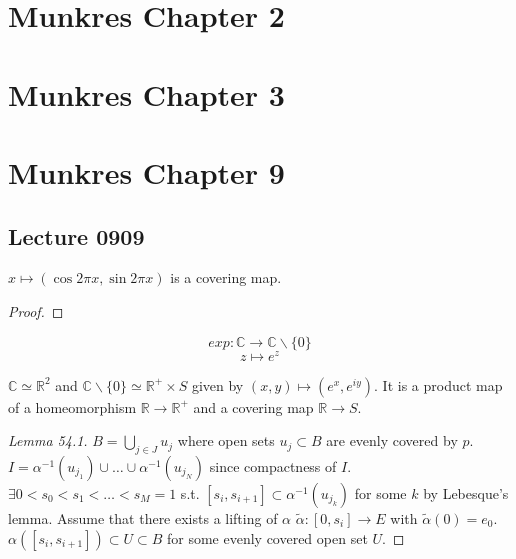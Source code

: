 \documentclass{article}
\begin{document}
\begin{multicols}{2}
\tableofcontents

\section{Munkres Chapter 2}

\clearpage

\section{Munkres Chapter 3}

\clearpage

\section{Munkres Chapter 9}

\clearpage

\subsection{Lecture 0909}

\begin{mytheorem}
$x\mapsto (\cos 2\pi x, \sin 2\pi x)$ is a covering map.
\end{mytheorem}
\begin{proof}

\end{proof}
\clearpage

\begin{example}
$$exp:\mathbb{C}\to \mathbb{C}\backslash \{0\}$$
$$z\mapsto e^z$$

$\mathbb{C}\simeq \mathbb{R}^2$ and $\mathbb{C}\backslash \{0\} \simeq \mathbb{R}^+\times S$ given by $(x,y)\mapsto (e^x,e^{iy})$. It is a product map of a homeomorphism $\mathbb{R}\to \mathbb{R}^+$ and a covering map $\mathbb{R}\to S$.
\end{example}

\begin{proof}
[Lemma 54.1]
$B=\bigcup_{j\in J}u_j$ where open sets $u_j\subset B$ are evenly covered by $p$. $I=\alpha^{-1}(u_{j_1})\cup\dots\cup\alpha^{-1}(u_{j_N})$ since compactness of $I$. $\exists 0<s_0<s_1<\dots<s_M=1$ s.t. $[s_i,s_{i+1}]\subset \alpha^{-1}(u_{j_k})$ for some $k$ by Lebesque's lemma. Assume that there exists a lifting of $\alpha$ $\tilde{\alpha}:[0,s_i]\to E$ with $\tilde{\alpha}(0)=e_0$. $\alpha([s_i,s_{i+1}])\subset U\subset B$ for some evenly covered open set $U$.
\end{proof}

\end{multicols}
\end{document}
